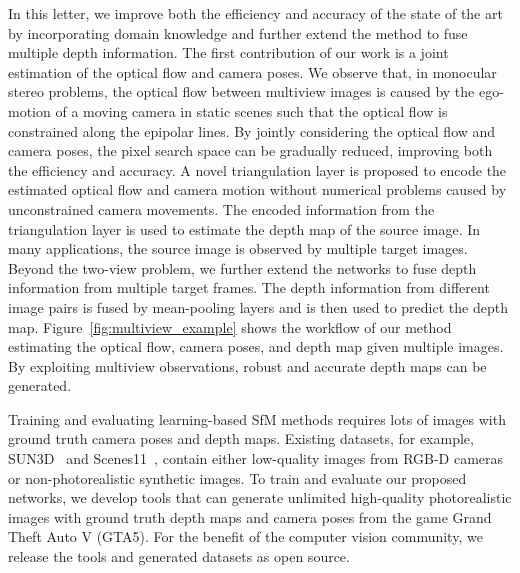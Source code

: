 \documentclass[letterpaper, 10 pt, conference]{ieeeconf}  %
\begin{document}
In this letter, we improve both the efficiency and accuracy of the state of the art by incorporating domain knowledge and further extend the method to fuse multiple depth information. The first contribution of our work is a joint estimation of the optical flow and camera poses. We observe that, in monocular stereo problems, the optical flow between multiview images is caused by the ego-motion of a moving camera in static scenes such that the optical flow is constrained along the epipolar lines. By jointly considering the optical flow and camera poses, the pixel search space can be gradually reduced, improving both the efficiency and accuracy. A novel triangulation layer is proposed to encode the estimated optical flow and camera motion without numerical problems caused by unconstrained camera movements. The encoded information from the triangulation layer is used to estimate the depth map of the source image. In many applications, the source image is observed by multiple target images. Beyond the two-view problem, we further extend the networks to fuse depth information from multiple target frames. The depth information from different image pairs is fused by mean-pooling layers and is then used to predict the depth map. Figure~\ref{fig:multiview_example} shows the workflow of our method estimating the optical flow, camera poses, and depth map given multiple images. By exploiting multiview observations, robust and accurate depth maps can be generated.
 
Training and evaluating learning-based SfM methods requires lots of images with ground truth camera poses and depth maps. Existing datasets, for example, SUN3D~\cite{sun3d} and Scenes11~\cite{demon}, contain either low-quality images from RGB-D cameras or non-photorealistic synthetic images. To train and evaluate our proposed networks, we develop tools that can generate unlimited high-quality photorealistic images with ground truth depth maps and camera poses from the game Grand Theft Auto V (GTA5). For the benefit of the computer vision community, we release the tools and generated datasets as open source.
 
\end{document}
